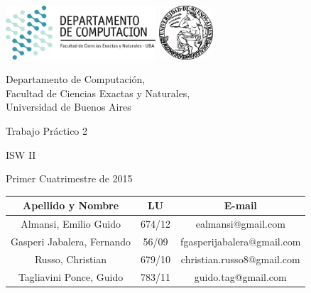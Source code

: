 \documentclass[a4paper, 10pt, twoside]{article}
\newcommand{\titulo}{Trabajo Práctico 2}
\newcommand{\materia}{ISW II}
\newcommand{\cuatrimestre}{Primer Cuatrimestre de 2015}
\begin{document}


\thispagestyle{caratula}

\begin{center}

\includegraphics[height=2cm]{DC.png} 
\hfill
\includegraphics[height=2cm]{UBA.jpg} 

\vspace{2cm}

Departamento de Computación,\\
Facultad de Ciencias Exactas y Naturales,\\
Universidad de Buenos Aires

\vspace{4cm}

\begin{Huge}
\titulo
\end{Huge}

\vspace{0.5cm}

\begin{Large}
\materia
\end{Large}

\vspace{1cm}

\cuatrimestre

\vspace{4cm}

\begin{tabular}{|c|c|c|}
\hline
Apellido y Nombre & LU & E-mail\\
\hline
Almansi, Emilio Guido         & 674/12 & ealmansi@gmail.com\\
Gasperi Jabalera, Fernando    & 56/09  & fgasperijabalera@gmail.com\\
Russo, Christian              & 679/10 & christian.russo8@gmail.com\\
Tagliavini Ponce, Guido       & 783/11 & guido.tag@gmail.com\\
\hline
\end{tabular}

\end{center}
\end{document}
